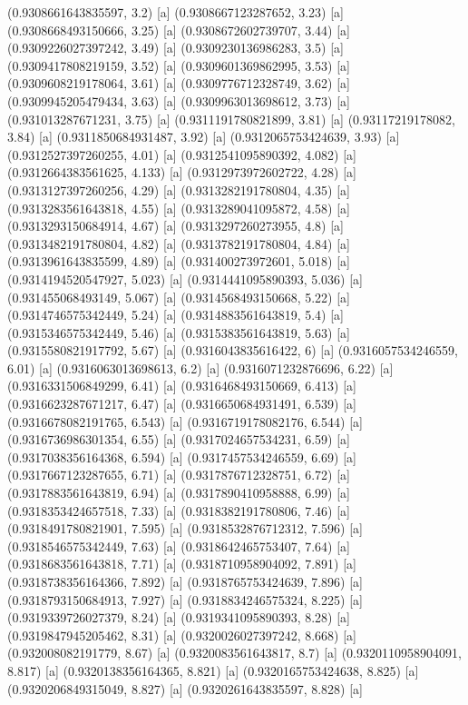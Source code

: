 {{{(0.9308661643835597, 3.2) [a] 
(0.9308667123287652, 3.23) [a] 
(0.9308668493150666, 3.25) [a] 
(0.9308672602739707, 3.44) [a] 
(0.9309226027397242, 3.49) [a] 
(0.9309230136986283, 3.5) [a] 
(0.9309417808219159, 3.52) [a] 
(0.9309601369862995, 3.53) [a] 
(0.9309608219178064, 3.61) [a] 
(0.9309776712328749, 3.62) [a] 
(0.9309945205479434, 3.63) [a] 
(0.9309963013698612, 3.73) [a] 
(0.931013287671231, 3.75) [a] 
(0.9311191780821899, 3.81) [a] 
(0.93117219178082, 3.84) [a] 
(0.9311850684931487, 3.92) [a] 
(0.9312065753424639, 3.93) [a] 
(0.9312527397260255, 4.01) [a] 
(0.9312541095890392, 4.082) [a] 
(0.9312664383561625, 4.133) [a] 
(0.9312973972602722, 4.28) [a] 
(0.9313127397260256, 4.29) [a] 
(0.9313282191780804, 4.35) [a] 
(0.9313283561643818, 4.55) [a] 
(0.9313289041095872, 4.58) [a] 
(0.9313293150684914, 4.67) [a] 
(0.9313297260273955, 4.8) [a] 
(0.9313482191780804, 4.82) [a] 
(0.9313782191780804, 4.84) [a] 
(0.9313961643835599, 4.89) [a] 
(0.931400273972601, 5.018) [a] 
(0.9314194520547927, 5.023) [a] 
(0.9314441095890393, 5.036) [a] 
(0.931455068493149, 5.067) [a] 
(0.9314568493150668, 5.22) [a] 
(0.9314746575342449, 5.24) [a] 
(0.9314883561643819, 5.4) [a] 
(0.9315346575342449, 5.46) [a] 
(0.9315383561643819, 5.63) [a] 
(0.9315580821917792, 5.67) [a] 
(0.9316043835616422, 6) [a] 
(0.9316057534246559, 6.01) [a] 
(0.9316063013698613, 6.2) [a] 
(0.9316071232876696, 6.22) [a] 
(0.9316331506849299, 6.41) [a] 
(0.9316468493150669, 6.413) [a] 
(0.9316623287671217, 6.47) [a] 
(0.9316650684931491, 6.539) [a] 
(0.9316678082191765, 6.543) [a] 
(0.9316719178082176, 6.544) [a] 
(0.9316736986301354, 6.55) [a] 
(0.9317024657534231, 6.59) [a] 
(0.9317038356164368, 6.594) [a] 
(0.9317457534246559, 6.69) [a] 
(0.9317667123287655, 6.71) [a] 
(0.9317876712328751, 6.72) [a] 
(0.9317883561643819, 6.94) [a] 
(0.9317890410958888, 6.99) [a] 
(0.9318353424657518, 7.33) [a] 
(0.9318382191780806, 7.46) [a] 
(0.9318491780821901, 7.595) [a] 
(0.9318532876712312, 7.596) [a] 
(0.9318546575342449, 7.63) [a] 
(0.9318642465753407, 7.64) [a] 
(0.9318683561643818, 7.71) [a] 
(0.9318710958904092, 7.891) [a] 
(0.9318738356164366, 7.892) [a] 
(0.9318765753424639, 7.896) [a] 
(0.9318793150684913, 7.927) [a] 
(0.9318834246575324, 8.225) [a] 
(0.9319339726027379, 8.24) [a] 
(0.9319341095890393, 8.28) [a] 
(0.9319847945205462, 8.31) [a] 
(0.9320026027397242, 8.668) [a] 
(0.932008082191779, 8.67) [a] 
(0.9320083561643817, 8.7) [a] 
(0.9320110958904091, 8.817) [a] 
(0.9320138356164365, 8.821) [a] 
(0.9320165753424638, 8.825) [a] 
(0.9320206849315049, 8.827) [a] 
(0.9320261643835597, 8.828) [a] 
}}}
